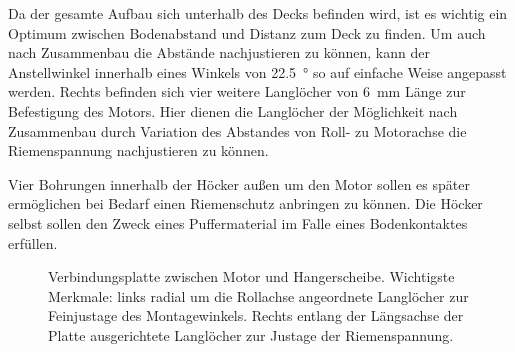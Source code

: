 		Da der gesamte Aufbau sich unterhalb des Decks befinden wird, ist es wichtig ein Optimum zwischen Bodenabstand und Distanz zum Deck zu finden.
		Um auch nach Zusammenbau die Abstände nachjustieren zu können, kann der Anstellwinkel innerhalb eines Winkels von \qty{22,5}{\degree} so auf einfache Weise angepasst werden.
		Rechts befinden sich vier weitere Langlöcher von \qty{6}{\milli\metre} Länge zur Befestigung des Motors.
		Hier dienen die Langlöcher der Möglichkeit nach Zusammenbau durch Variation des Abstandes von Roll- zu Motorachse die Riemenspannung nachjustieren zu können.\par
		Vier Bohrungen innerhalb der Höcker außen um den Motor sollen es später ermöglichen bei Bedarf einen Riemenschutz anbringen zu können.
		Die Höcker selbst sollen den Zweck eines Puffermaterial im Falle eines Bodenkontaktes erfüllen.

		\begin{figure}[h]
			\centering
			
			\caption[Verbindungsplatte zwischen Motor und Hangerscheibe]{Verbindungsplatte zwischen Motor und Hangerscheibe. Wichtigste Merkmale: links radial um die Rollachse angeordnete Langlöcher zur Feinjustage des Montagewinkels. Rechts entlang der Längsachse der Platte ausgerichtete Langlöcher zur Justage der Riemenspannung.}
			\label{fig:motor piece drawing}
		\end{figure}
